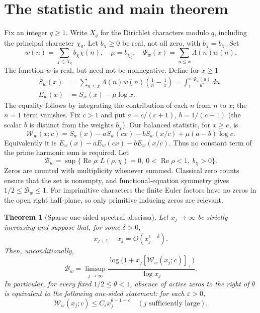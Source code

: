 \documentclass[11pt]{article}
\newtheorem{theorem}{Theorem}[section]
\theoremstyle{remark}\newtheorem{remark}[theorem]{Remark}
\newcommand{\Rea}{\operatorname{Re}}\newcommand{\Ima}{\operatorname{Im}}
\newcommand{\pos}[1]{\left[#1\right]_+}
\newcommand{\B}{\mathcal B}\newcommand{\W}{\mathcal W}
\begin{document}
\section{The statistic and main theorem}
Fix an integer $q\ge1$. Write $X_q$ for the Dirichlet characters modulo $q$, including the principal character $\chi_0$. Let $b_\chi\ge0$ be real, not all zero, with $b_{\bar\chi}=b_\chi$. Set
\[
 w(n)=\sum_{\chi\in X_q}b_\chi\chi(n),\quad \mu=b_{\chi_0},\quad
 \Psi_w(x)=\sum_{n\le x}\Lambda(n)w(n).
\]
The function $w$ is real, but need not be nonnegative. Define for $x\ge1$
\begin{align*}
 S_w(x)&=\sum_{n\le x}\Lambda(n)w(n)\left(\frac1n-\frac1x\right)
       =\int_1^x\frac{\Psi_w(u)}{u^2}\,du,\\
 E_w(x)&=S_w(x)-\mu\log x.
\end{align*}
The equality follows by integrating the contribution of each $n$ from $n$ to $x$; the $n=1$ term vanishes. Fix $c>1$ and put $a=c/(c+1)$, $b=1/(c+1)$ (the scalar $b$ is distinct from the weights $b_\chi$). Our balanced statistic, for $x\ge c$, is
\begin{equation}\label{eq:W}
\boxed{\W_w(x;c)=S_w(x)-aS_w(cx)-bS_w(x/c)+\mu(a-b)\log c.}
\end{equation}
Equivalently it is $E_w(x)-aE_w(cx)-bE_w(x/c)$. Thus no constant term of the prime harmonic sum is required. Let
\[
 \B_w=\sup\{\Rea\rho: L(\rho,\chi)=0,\ 0<\Rea\rho<1,\ b_\chi>0\}.
\]
Zeros are counted with multiplicity whenever summed. Classical zero counts ensure that the set is nonempty, and functional-equation symmetry gives $1/2\le \B_w\le1$. For imprimitive characters the finite Euler factors have no zeros in the open right half-plane, so only primitive inducing zeros are relevant.

\begin{theorem}[Sparse one-sided spectral abscissa]\label{th:abscissa}
Let $x_j\to\infty$ be strictly increasing and suppose that, for some $\delta>0$,
\begin{equation}\label{eq:mesh}
 x_{j+1}-x_j=O(x_j^{1-\delta}).
\end{equation}
Then, unconditionally,
\begin{equation}\label{eq:abscissa}
\boxed{\displaystyle
 \B_w=\limsup_{j\to\infty}
 \frac{\log\bigl(1+x_j\pos{\W_w(x_j;c)}\bigr)}{\log x_j}.}
\end{equation}
In particular, for every fixed $1/2\le\theta<1$, absence of active zeros to the right of $\theta$ is equivalent to the following one-sided statement: for each $\varepsilon>0$,
\begin{equation}\label{eq:sparsebound}
 \W_w(x_j;c)\le C_\varepsilon x_j^{\theta-1+\varepsilon}
 \quad(j\text{ sufficiently large}).
\end{equation}
\end{theorem}
\end{document}
